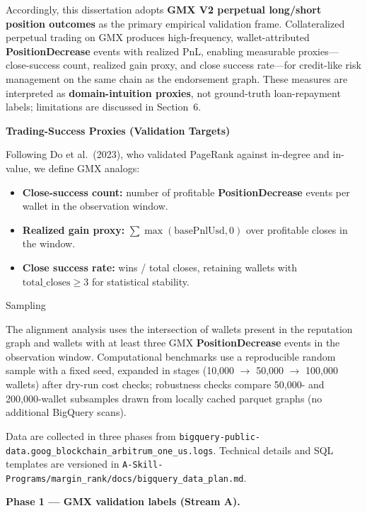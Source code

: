 Accordingly, this dissertation adopts \textbf{GMX V2 perpetual long/short position outcomes} as the primary empirical validation frame. Collateralized perpetual trading on GMX produces high-frequency, wallet-attributed \textbf{PositionDecrease} events with realized PnL, enabling measurable proxies---close-success count, realized gain proxy, and close success rate---for credit-like risk management on the same chain as the endorsement graph. These measures are interpreted as \textbf{domain-intuition proxies}, not ground-truth loan-repayment labels; limitations are discussed in Section~6.


\textbf{Trading-Success Proxies (Validation Targets)}


Following Do et al.\ (2023), who validated PageRank against in-degree and in-value, we define GMX analogs:

\begin{itemize}
\item[\textbullet] \textbf{Close-success count:} number of profitable \textbf{PositionDecrease} events per wallet in the observation window.
\item[\textbullet] \textbf{Realized gain proxy:} $\sum \max(\text{basePnlUsd}, 0)$ over profitable closes in the window.
\item[\textbullet] \textbf{Close success rate:} wins / total closes, retaining wallets with $\text{total\_closes} \geq 3$ for statistical stability.
\end{itemize}


Sampling


The alignment analysis uses the intersection of wallets present in the reputation graph and wallets with at least three GMX \textbf{PositionDecrease} events in the observation window. Computational benchmarks use a reproducible random sample with a fixed seed, expanded in stages (10,000 $\to$ 50,000 $\to$ 100,000 wallets) after dry-run cost checks; robustness checks compare 50,000- and 200,000-wallet subsamples drawn from locally cached parquet graphs (no additional BigQuery scans).



Data are collected in three phases from \texttt{bigquery-public-data.goog\_blockchain\_arbitrum\_one\_us.logs}. Technical details and SQL templates are versioned in \texttt{A-Skill-Programs/margin\_rank/docs/bigquery\_data\_plan.md}.


\textbf{Phase 1 --- GMX validation labels (Stream A).}


